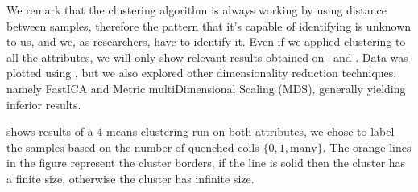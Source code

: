 We remark that the clustering algorithm is always working by using distance between samples,
therefore the pattern that it's capable of identifying is unknown to us, and we, as researchers,
have to identify it. Even if we applied clustering to all the attributes, we will only show
relevant results obtained on \an\ and \cnmod. Data was plotted using \pca, but we also explored
other dimensionality reduction techniques, namely FastICA and Metric multiDimensional Scaling (MDS),
generally yielding inferior results.

 shows results of a $4$-means clustering run on both attributes, we chose
to label the samples based on the number of quenched coils $\{0, 1, \text{many}\}$. The orange lines
in the figure represent the cluster borders, if the line is solid then the cluster has a finite size, otherwise the cluster has infinite size.

